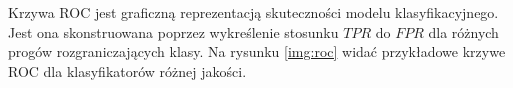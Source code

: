 \documentclass[a4paper, twoside, 11pt, openright]{article}
\begin{document}
Krzywa ROC jest graficzną reprezentacją skuteczności modelu klasyfikacyjnego. Jest ona skonstruowana poprzez wykreślenie stosunku $TPR$ do $FPR$ dla różnych progów rozgraniczających klasy. Na rysunku \ref{img:roc} widać przykładowe krzywe ROC dla klasyfikatorów różnej jakości.


\begin{figure}[H]%
\centering
{}%
\qquad
{}%
\qquad
{}%

\end{figure}
\end{document}
